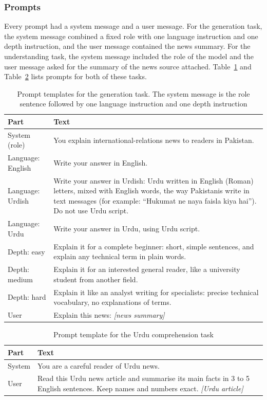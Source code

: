 \documentclass{FastFyp}
\begin{document}
\subsubsection{Prompts}
Every prompt had a system message and a user message. For the generation task, the system message combined a fixed role with one language instruction and one depth instruction, and the user message contained the news summary. For the understanding task, the system message included the role of the model and the user message asked for the summary of the news source attached. Table~\ref{tab:prompts-gen} and Table~\ref{tab:prompts-comp} lists prompts for both of these tasks.

\begin{table}[!ht]
\centering
\caption{Prompt templates for the generation task. The system message is the role sentence followed by one language instruction and one depth instruction}
\label{tab:prompts-gen}
\small
\begin{tabular}{|p{}|p{}|}
\hline
\textbf{Part} & \textbf{Text} \\ \hline
System (role) & You explain international-relations news to readers in Pakistan. \\ \hline
Language: English & Write your answer in English. \\ \hline
Language: Urdish & Write your answer in Urdish: Urdu written in English (Roman) letters, mixed with English words, the way Pakistanis write in text messages (for example: ``Hukumat ne naya faisla kiya hai''). Do not use Urdu script. \\ \hline
Language: Urdu & Write your answer in Urdu, using Urdu script. \\ \hline
Depth: easy & Explain it for a complete beginner: short, simple sentences, and explain any technical term in plain words. \\ \hline
Depth: medium & Explain it for an interested general reader, like a university student from another field. \\ \hline
Depth: hard & Explain it like an analyst writing for specialists: precise technical vocabulary, no explanations of terms. \\ \hline
User & Explain this news: \textit{[news summary]} \\ \hline
\end{tabular}
\end{table}

\begin{table}[!ht]
\centering
\caption{Prompt template for the Urdu comprehension task}
\label{tab:prompts-comp}
\small
\begin{tabular}{|p{}|p{}|}
\hline
\textbf{Part} & \textbf{Text} \\ \hline
System & You are a careful reader of Urdu news. \\ \hline
User & Read this Urdu news article and summarise its main facts in 3 to 5 English sentences. Keep names and numbers exact. \textit{[Urdu article]} \\ \hline
\end{tabular}
\end{table}
\end{document}
